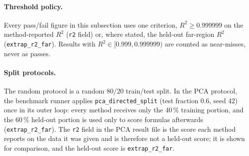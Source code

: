 \documentclass[twoside,11pt]{article}
\newcommand{\Rsq}{R^{2}}
\begin{document}
\paragraph{Threshold policy.} Every pass/fail figure in this subsection uses
one criterion, $\Rsq \geq 0.999999$ on the method-reported $\Rsq$ (\texttt{r2} field) or, where stated, the
held-out far-region $\Rsq$ (\texttt{extrap\_r2\_far}).
Results with $\Rsq \in [0.999, 0.999999)$ are counted as near-misses, never as
passes.

\paragraph{Split protocols.} The random protocol is a random 80/20
train/test split. In the PCA protocol, the benchmark runner applies
\texttt{pca\_directed\_split} (test fraction 0.6, seed 42) once in its outer loop:
every method receives only the 40\,\% training portion, and the 60\,\% held-out portion is used
only to score formulas afterwards (\texttt{extrap\_r2\_far}). The \texttt{r2} field in the PCA result file
is the score each method reports on the data it was given and is therefore not a held-out score; it is
shown for comparison, and the held-out score is \texttt{extrap\_r2\_far}.
\end{document}
